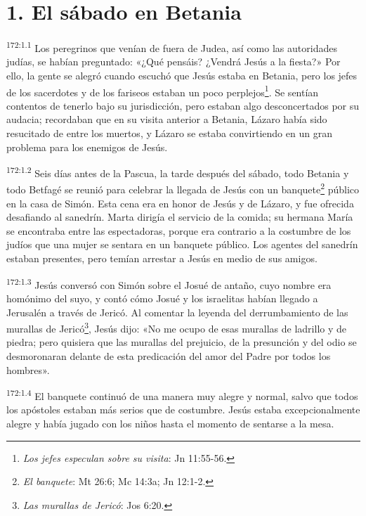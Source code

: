 \section*{1. El sábado en Betania}
\par 
\textsuperscript{172:1.1} Los peregrinos que venían de fuera de Judea, así como las autoridades judías, se habían preguntado: «¿Qué pensáis? ¿Vendrá Jesús a la fiesta?» Por ello, la gente se alegró cuando escuchó que Jesús estaba en Betania, pero los jefes de los sacerdotes y de los fariseos estaban un poco perplejos\footnote{\textit{Los jefes especulan sobre su visita}: Jn 11:55-56.}. Se sentían contentos de tenerlo bajo su jurisdicción, pero estaban algo desconcertados por su audacia; recordaban que en su visita anterior a Betania, Lázaro había sido resucitado de entre los muertos, y Lázaro se estaba convirtiendo en un gran problema para los enemigos de Jesús.

\par 
\textsuperscript{172:1.2} Seis días antes de la Pascua, la tarde después del sábado, todo Betania y todo Betfagé se reunió para celebrar la llegada de Jesús con un banquete\footnote{\textit{El banquete}: Mt 26:6; Mc 14:3a; Jn 12:1-2.} público en la casa de Simón. Esta cena era en honor de Jesús y de Lázaro, y fue ofrecida desafiando al sanedrín. Marta dirigía el servicio de la comida; su hermana María se encontraba entre las espectadoras, porque era contrario a la costumbre de los judíos que una mujer se sentara en un banquete público. Los agentes del sanedrín estaban presentes, pero temían arrestar a Jesús en medio de sus amigos.

\par 
\textsuperscript{172:1.3} Jesús conversó con Simón sobre el Josué de antaño, cuyo nombre era homónimo del suyo, y contó cómo Josué y los israelitas habían llegado a Jerusalén a través de Jericó. Al comentar la leyenda del derrumbamiento de las murallas de Jericó\footnote{\textit{Las murallas de Jericó}: Jos 6:20.}, Jesús dijo: «No me ocupo de esas murallas de ladrillo y de piedra; pero quisiera que las murallas del prejuicio, de la presunción y del odio se desmoronaran delante de esta predicación del amor del Padre por todos los hombres».

\par 
\textsuperscript{172:1.4} El banquete continuó de una manera muy alegre y normal, salvo que todos los apóstoles estaban más serios que de costumbre. Jesús estaba excepcionalmente alegre y había jugado con los niños hasta el momento de sentarse a la mesa.

